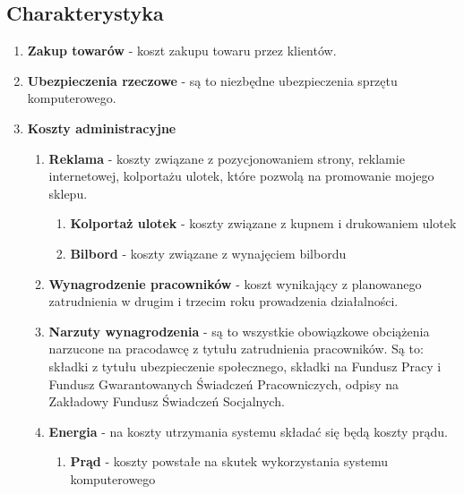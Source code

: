 \subsection{Charakterystyka}

	\begin{enumerate}
		\item{\textbf{Zakup towarów}} - koszt zakupu towaru przez klientów.
		
		\item{\textbf{Ubezpieczenia rzeczowe}} - są to niezbędne ubezpieczenia sprzętu komputerowego.
		
		\item{\textbf{Koszty administracyjne }}
			\begin{enumerate}
				
				\item{\textbf{Reklama}} - koszty związane z pozycjonowaniem strony, reklamie internetowej, kolportażu ulotek, które pozwolą na promowanie mojego sklepu.
				
					\begin{enumerate}
					
						\item{\textbf{Kolportaż ulotek}} - koszty związane z kupnem i drukowaniem ulotek 
		
						\item{\textbf{Bilbord}} - koszty związane z wynajęciem bilbordu
					
					\end{enumerate}
					
				\item{\textbf{Wynagrodzenie pracowników}} - koszt wynikający z planowanego zatrudnienia w drugim i trzecim roku prowadzenia działalności.
			
				\item{\textbf{Narzuty wynagrodzenia}} - są to wszystkie obowiązkowe obciążenia narzucone na pracodawcę z tytułu zatrudnienia pracowników. Są to: składki z tytułu ubezpieczenie społecznego, składki na Fundusz Pracy i Fundusz Gwarantowanych Świadczeń Pracowniczych, odpisy na Zakładowy Fundusz Świadczeń Socjalnych.
			
				\item{\textbf{Energia}} - na koszty utrzymania systemu składać się będą koszty prądu.
					\begin{enumerate}
						
						\item{\textbf{Prąd}} - koszty powstałe na skutek wykorzystania systemu komputerowego \label{prad}
						

\end{enumerate}
\end{enumerate}
\end{enumerate}
